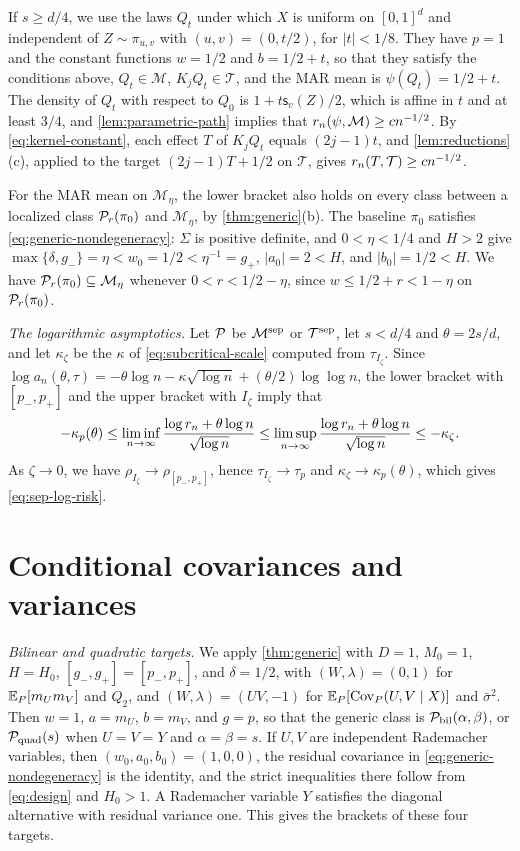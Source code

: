 If $s\ge d/4$, we use the laws $Q_t$ under which $X$ is uniform on
$[0,1]^d$ and independent of $Z\sim\pi_{u,v}$ with $(u,v)=(0,t/2)$,
for $|t|<1/8$. They have $p=1$ and the constant functions $w=1/2$ and
$b=1/2+t$, so that they satisfy the conditions above, $Q_t\in\mathcal M$,
$K_jQ_t\in\mathcal T$, and the MAR mean is $\psi(Q_t)=1/2+t$. The
density of $Q_t$ with respect to $Q_0$ is $1+t\mathsf s_v(Z)/2$, which
is affine in $t$ and at least $3/4$, and
\cref{lem:parametric-path} implies that
$r_n(\psi,\mathcal M)\ge cn^{-1/2}$. By \eqref{eq:kernel-constant},
each effect $T$ of $K_jQ_t$ equals $(2j-1)t$, and
\cref{lem:reductions}(c), applied to the target $(2j-1)T+1/2$ on
$\mathcal T$, gives $r_n(T,\mathcal T)\ge cn^{-1/2}$.

For the MAR mean on $\mathcal M_\eta$, the lower bracket also holds on
every class between a localized class $\mathcal P_r(\pi_0)$ and
$\mathcal M_\eta$, by \cref{thm:generic}(b). The baseline
$\pi_0$ satisfies \eqref{eq:generic-nondegeneracy}: $\Sigma$ is
positive definite, and $0<\eta<1/4$ and $H>2$ give
$\max\{\delta,g_-\}=\eta<w_0=1/2<\eta^{-1}=g_+$, $|a_0|=2<H$, and
$|b_0|=1/2<H$. We have $\mathcal P_r(\pi_0)\subseteq\mathcal M_\eta$ whenever
$0<r<1/2-\eta$, since $w\le1/2+r<1-\eta$ on $\mathcal P_r(\pi_0)$.

\emph{The logarithmic asymptotics.} Let $\mathcal P$ be $\mathcal M^{\rm sep}$
or $\mathcal T^{\rm sep}$, let $s<d/4$ and $\theta=2s/d$, and let
$\kappa_\zeta$ be the $\kappa$ of \eqref{eq:subcritical-scale} computed
from $\tau_{I_\zeta}$. Since
$\log a_n(\theta,\tau)=-\theta\log n-\kappa\sqrt{\log n}
+(\theta/2)\log\log n$, the lower bracket with $[p_-,p_+]$ and the
upper bracket with $I_\zeta$ imply that
\[
 -\kappa_p(\theta)\le\liminf_{n\to\infty}\frac{\log r_n+\theta\log n}{\sqrt{\log n}}
 \le\limsup_{n\to\infty}\frac{\log r_n+\theta\log n}{\sqrt{\log n}}
 \le-\kappa_\zeta .
\]
As $\zeta\to0$, we have $\rho_{I_\zeta}\to\rho_{[p_-,p_+]}$, hence
$\tau_{I_\zeta}\to\tau_p$ and $\kappa_\zeta\to\kappa_p(\theta)$, which
gives \eqref{eq:sep-log-risk}.
\chapter{Conditional covariances and variances}\label{sec:products-proof}

\emph{Bilinear and quadratic targets.} We apply
\cref{thm:generic} with $D=1$, $M_0=1$, $H=H_0$,
$[g_-,g_+]=[p_-,p_+]$, and $\delta=1/2$, with $(W,\lambda)=(0,1)$ for
$\mathbb E_P[m_Um_V]$ and $Q_2$, and $(W,\lambda)=(UV,-1)$ for
$\mathbb E_P[\operatorname{Cov}_P(U,V\mid X)]$ and $\bar\sigma^2$. Then $w=1$, $a=m_U$,
$b=m_V$, and $g=p$, so that the generic class is
$\mathcal P_{\rm bil}(\alpha,\beta)$, or $\mathcal P_{\rm quad}(s)$ when $U=V=Y$ and
$\alpha=\beta=s$. If $U,V$ are independent Rademacher variables, then
$(w_0,a_0,b_0)=(1,0,0)$, the residual covariance in
\eqref{eq:generic-nondegeneracy} is the identity, and the strict
inequalities there follow from \eqref{eq:design} and $H_0>1$. A Rademacher variable $Y$ satisfies the
diagonal alternative with residual variance one. This gives the
brackets of these four targets.


